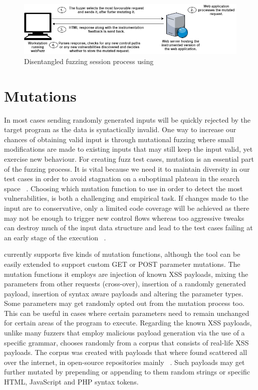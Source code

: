 \begin{figure}[ht]
 \centering
 \captionsetup{justification=centering}
 \includegraphics[width=5.2in]{figures/architecture.png}
 \caption{Disentangled fuzzing session process using \pname{}}
 \label{fig:architecture}
\end{figure}

\section{Mutations}
In most cases sending randomly generated inputs will be quickly rejected by the target program as the data is syntactically invalid. One way to increase our chances of obtaining valid input is through mutational fuzzing where small modifications are made to existing inputs that may still keep the input valid, yet exercise new behaviour. For creating fuzz test cases, mutation is an essential part of the fuzzing process. It is vital because we need it to maintain diversity in our test cases in order to avoid stagnation on a suboptimal plateau in the search space ~\cite{seal2016Genetic}. Choosing which mutation function to use in order to detect the most vulnerabilities, is both a challenging and empirical task. If changes made to the input are to conservative, only a limited code coverage will be achieved as there may not be enough to trigger new control flows whereas too aggressive tweaks can destroy much of the input data structure and lead to the test cases failing at an early stage of the execution ~\cite{zalewski2014Mutations}.

\pname{} currently supports five kinds of mutation functions, although the tool can be easily
extended to support custom GET or POST parameter mutations. The mutation functions it employs are injection of known XSS payloads, mixing the parameters from other requests (cross-over), insertion of a randomly generated payload, insertion of syntax aware payloads and altering the
parameter types. Some parameters may get randomly opted out from the mutation process too. This can be useful in cases where certain parameters need to remain unchanged for certain areas of the program to execute. Regarding the known XSS payloads, unlike many fuzzers that employ malicious payload generation via the use of a specific grammar, \pname{} chooses randomly from a corpus that consists of real-life XSS payloads. The corpus was created with payloads that where found scattered all over the internet, in open-source repositories mainly ~\cite{xsspayloadfirst,xsspayloadsecond}. Such payloads may get further mutated by prepending or appending to them random strings or specific HTML, JavaScript and PHP syntax tokens.

